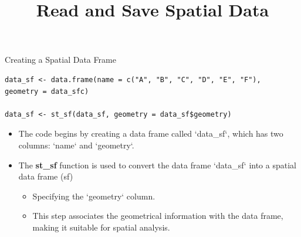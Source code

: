 \documentclass[dvipsnames,hyperref={pdfpagelabels=false}]{beamer}
\begin{document}
\begin{frame}[fragile]{Creating a Spatial Data Frame}{}
\begin{lstlisting}
data_sf <- data.frame(name = c("A", "B", "C", "D", "E", "F"),
geometry = data_sfc)

data_sf <- st_sf(data_sf, geometry = data_sf$geometry)
\end{lstlisting}
\begin{itemize}
	\item The code begins by creating a data frame called `data\_sf`, which has two columns: `name` and `geometry`.
	\vspace{0.2cm}
	\item The \textbf{st\_sf} function is used to convert the data frame `data\_sf` into a spatial data frame (sf) 
		\vspace{0.2cm}
	\begin{itemize}
	\item Specifying the `geometry` column. 
		\vspace{0.2cm}
	\item This step associates the geometrical information with the data frame, making it suitable for spatial analysis.
\end{itemize}
\end{itemize}
\end{frame}



\title[]  
{Read and Save Spatial Data}


\author 
{}

\institute{}






\date
{}


\begin{frame}{}
\titlepage
\end{frame}
\end{document}
